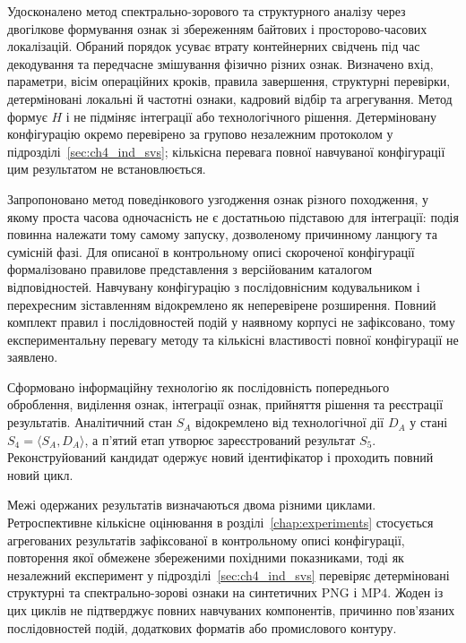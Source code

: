 Удосконалено метод спектрально-зорового та структурного аналізу через двогілкове формування ознак зі збереженням байтових і просторово-часових локалізацій. Обраний порядок усуває втрату контейнерних свідчень під час декодування та передчасне змішування фізично різних ознак. Визначено вхід, параметри, вісім операційних кроків, правила завершення, структурні перевірки, детерміновані локальні й частотні ознаки, кадровий відбір та агрегування. Метод формує $H$ і не підміняє інтеграції або технологічного рішення. Детерміновану конфігурацію окремо перевірено за групово незалежним протоколом у підрозділі~\ref{sec:ch4_ind_svs}; кількісна перевага повної навчуваної конфігурації цим результатом не встановлюється.

Запропоновано метод поведінкового узгодження ознак різного походження, у якому проста часова одночасність не є достатньою підставою для інтеграції: подія повинна належати тому самому запуску, дозволеному причинному ланцюгу та сумісній фазі. Для описаної в контрольному описі скороченої конфігурації формалізовано правилове представлення з версійованим каталогом відповідностей. Навчувану конфігурацію з послідовнісним кодувальником і перехресним зіставленням відокремлено як неперевірене розширення. Повний комплект правил і послідовностей подій у наявному корпусі не зафіксовано, тому експериментальну перевагу методу та кількісні властивості повної конфігурації не заявлено.

Сформовано інформаційну технологію як послідовність попереднього оброблення, виділення ознак, інтеграції ознак, прийняття рішення та реєстрації результатів. Аналітичний стан $S_A$ відокремлено від технологічної дії $D_A$ у стані $S_4=\langle S_A,D_A\rangle$, а п’ятий етап утворює зареєстрований результат $S_5$. Реконструйований кандидат одержує новий ідентифікатор і проходить повний новий цикл.

Межі одержаних результатів визначаються двома різними циклами. Ретроспективне кількісне оцінювання в розділі~\ref{chap:experiments} стосується агрегованих результатів зафіксованої в контрольному описі конфігурації, повторення якої обмежене збереженими похідними показниками, тоді як незалежний експеримент у підрозділі~\ref{sec:ch4_ind_svs} перевіряє детерміновані структурні та спектрально-зорові ознаки на синтетичних PNG і MP4. Жоден із цих циклів не підтверджує повних навчуваних компонентів, причинно пов’язаних послідовностей подій, додаткових форматів або промислового контуру.
